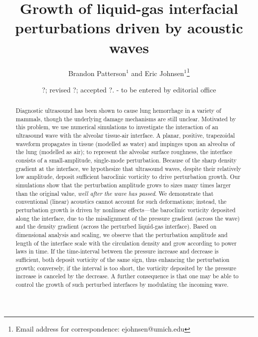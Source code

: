 \documentclass{jfm}%
\title[]{Growth of liquid-gas interfacial perturbations driven by acoustic waves}
\author[B. Patterson and E. Johnsen]%
{Brandon Patterson$^1$ and %
  Eric Johnsen$^1$\thanks{Email address for correspondence: ejohnsen@umich.edu}\ns
}
\affiliation{$^1$Department of Mechanical Engineering, University of Michigan,
  Ann Arbor, MI 48109, USA}
\date{?; revised ?; accepted ?. - to be entered by editorial office}
\begin{document}
\maketitle

\begin{acronym}
\end{acronym}

\begin{abstract}
  Diagnostic ultrasound has been shown to cause lung hemorrhage in a
  variety of mammals, though the underlying damage mechanisms are
  still unclear. Motivated by this problem, we use numerical
  simulations to investigate the interaction of an ultrasound wave
  with the alveolar tissue-air interface. A planar, positive, trapezoidal waveform
  propagates in tissue (modelled as water) and
  impinges upon an alveolus of the lung (modelled as air); to
  represent the alveolar surface roughness, the interface consists of a
  small-amplitude, single-mode perturbation. Because of the sharp
  density gradient at the interface, we hypothesize that ultrasound
  waves, despite their relatively low amplitude, deposit sufficient
  baroclinic vorticity to drive perturbation growth. Our simulations
  show that the perturbation amplitude grows to sizes many times
  larger than the original value, \emph{well after the wave has
    passed}. We demonstrate that conventional (linear) acoustics
  cannot account for such deformations; instead, the perturbation
  growth is driven by nonlinear effects---the baroclinic vorticity
  deposited along the interface, due to the misalignment of the
  pressure gradient (across the wave) and the density gradient (across
  the perturbed liquid-gas interface). Based on dimensional analysis
  and scaling, we observe that the perturbation amplitude and length of the
  interface scale with the circulation density and grow according to
  power laws in time. If the time-interval between the pressure increase
  and decrease is sufficient, both deposit vorticity of the same sign,
  thus enhancing the perturbation growth; conversely, if the interval
  is too short, the vorticity deposited by the pressure increase is
  canceled by the decrease. A further consequence is that one may be
  able to control the growth of such perturbed interfaces by
  modulating the incoming wave.
\end{abstract}
\end{document}
